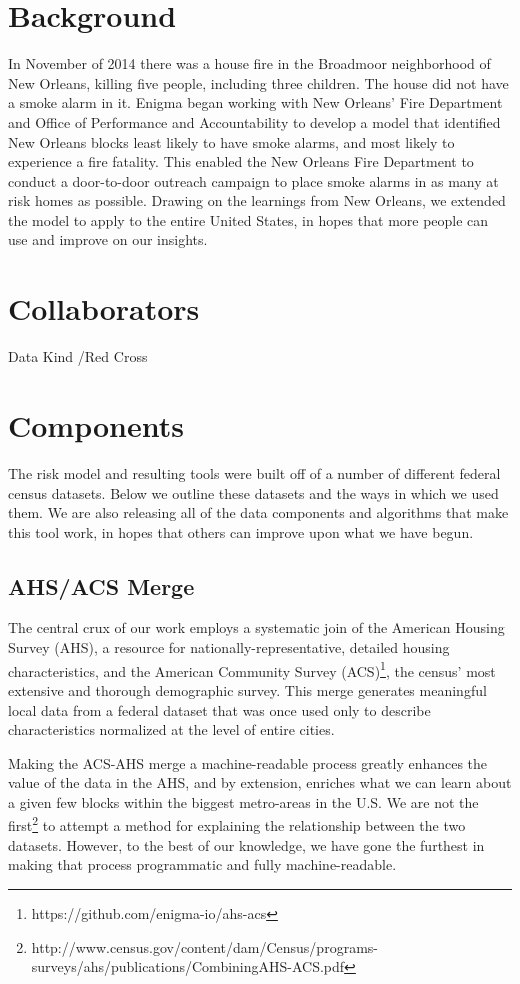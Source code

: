 \documentclass{sig-alternate}
\begin{document}
\section{Background}

In November of 2014 there was a house fire in the Broadmoor neighborhood of New Orleans, killing five people, including three children. The house did not have a smoke alarm in it. Enigma began working with New Orleans' Fire Department and Office of Performance and Accountability to develop a model that identified New Orleans blocks least likely to have smoke alarms, and most likely to experience a fire fatality. This enabled the New Orleans Fire Department to conduct a door-to-door outreach campaign to place smoke alarms in as many at risk homes as possible. Drawing on the learnings from New Orleans, we extended the model to apply to the entire United States, in hopes that more people can use and improve on our insights.


\section{Collaborators}
Data Kind /Red Cross


\section{Components}

The risk model and resulting tools were built off of a number of different federal census datasets. Below we outline these datasets and the ways in which we used them. We are also releasing all of the data components and algorithms that make this tool work, in hopes that others can improve upon what we have begun.

\subsection{AHS/ACS Merge}

The central crux of our work employs a systematic join of the American Housing Survey (AHS), a resource for nationally-representative, detailed housing characteristics, and the American Community Survey (ACS)\footnote{https://github.com/enigma-io/ahs-acs}, the census' most extensive and thorough demographic survey. This merge generates meaningful local data from a federal dataset that was once used only to describe characteristics normalized at the level of entire cities.

Making the ACS-AHS merge a machine-readable process greatly enhances the value of the data in the AHS, and by extension, enriches what we can learn about a given few blocks within the biggest metro-areas in the U.S. We are not the first\footnote{http://www.census.gov/content/dam/Census/programs-surveys/ahs/publications/CombiningAHS-ACS.pdf} to attempt a method for explaining the relationship between the two datasets. However, to the best of our knowledge, we have gone the furthest in making that process programmatic and fully machine-readable.
\end{document}
